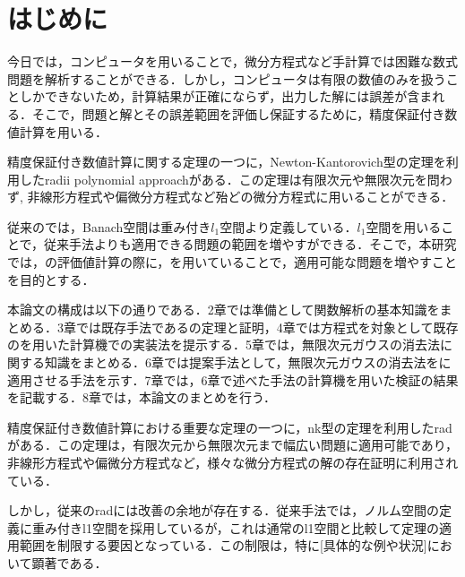 \chapter{はじめに}

今日では，コンピュータを用いることで，微分方程式など手計算では困難な数式問題を解析することができる．しかし，コンピュータは有限の数値のみを扱うことしかできないため，計算結果が正確にならず，出力した解には誤差が含まれる．そこで，問題と解とその誤差範囲を評価し保証するために，精度保証付き数値計算を用いる\cite{b1}．

精度保証付き数値計算に関する定理の一つに，Newton-Kantorovich型の定理を利用したradii polynomial approachがある．この定理は有限次元や無限次元を問わず, 非線形方程式や偏微分方程式など殆どの微分方程式に用いることができる．

従来の\rad{}では，Banach空間は重み付き$l_1$空間より定義している．$l_1$空間を用いることで，従来手法よりも適用できる問題の範囲を増やすができる．そこで，本研究では，\rad{}の評価値計算の際に，\infg{}を用いていることで，適用可能な問題を増やすことを目的とする．


本論文の構成は以下の通りである．2章では準備として関数解析の基本知識をまとめる．3章では既存手法である\rad{}の定理と証明，4章では\vdp{}方程式を対象として既存の\rad{}を用いた計算機での実装法を提示する．5章では，無限次元ガウスの消去法に関する知識をまとめる．6章では提案手法として，無限次元ガウスの消去法を\rad{}に適用させる手法を示す．7章では，6章で述べた手法の計算機を用いた検証の結果を記載する．8章では，本論文のまとめを行う．

\hrulefill

精度保証付き数値計算における重要な定理の一つに，nk型の定理を利用したradがある．この定理は，有限次元から無限次元まで幅広い問題に適用可能であり，非線形方程式や偏微分方程式など，様々な微分方程式の解の存在証明に利用されている．

しかし，従来のradには改善の余地が存在する．従来手法では，ノルム空間の定義に重み付きl1空間を採用しているが，これは通常のl1空間と比較して定理の適用範囲を制限する要因となっている．この制限は，特に[具体的な例や状況]において顕著である．

\hrulefill
